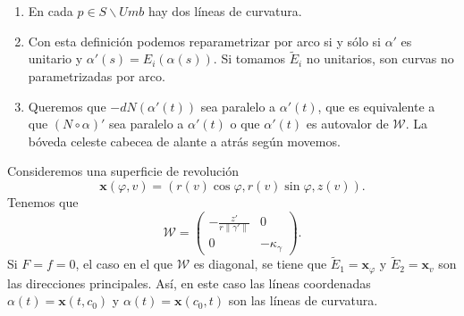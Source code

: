 \begin{observation}
\begin{enumerate}
	Así, tenemos que 
	\[\tilde{E}_{i}=\begin{pmatrix} -b \\ a - K_{i} \end{pmatrix}\quad \text{y} \quad E_{i}=\frac{\tilde{E}_{i}}{\|\tilde{E}_{i}\|} ,\]
	que son ambas $\displaystyle \mathcal{C}^{\infty } $. Además, $\displaystyle E_{1}\perp E_{2} $. Las líneas de flujos de $\displaystyle E_{1} $ y las de $\displaystyle E_{2} $ dan dos familias de curvas que son lineales de curvatura y que se cortan perpendicularmente. 
\item En cada $\displaystyle p \in S\backslash Umb $ hay dos líneas de curvatura. 
\item Con esta definición podemos reparametrizar por arco si y sólo si $\displaystyle \alpha'  $ es unitario y $\displaystyle \alpha'\left(s\right)=E_{i}\left(\alpha\left(s\right)\right) $. Si tomamos $\displaystyle \tilde{E}_{i} $ no unitarios, son curvas no parametrizadas por arco. 
\item Queremos que $\displaystyle -dN\left(\alpha'\left(t\right)\right) $ sea paralelo a $\displaystyle \alpha'\left(t\right) $, que es equivalente a que $\displaystyle \left(N\circ \alpha \right)' $ sea paralelo a $\displaystyle \alpha'\left(t\right) $ o que $\displaystyle \alpha'\left(t\right) $ es autovalor de $\displaystyle \mathcal{W} $. La bóveda celeste cabecea de alante a atrás según movemos. 
\end{enumerate}
\end{observation}
\begin{eg}
Consideremos una superficie de revolución
\[ \textbf{x} \left(\varphi, v\right)=\left(r\left(v\right)\cos \varphi, r\left(v\right)\sin \varphi, z\left(v\right)\right) .\]
Tenemos que 
\[\mathcal{W}=\begin{pmatrix} -\frac{z'}{r\|\gamma'\|} & 0 \\ 0 & -\kappa_{\gamma } \end{pmatrix} .\]
Si $\displaystyle F = f = 0 $, el caso en el que $\displaystyle \mathcal{W} $ es diagonal, se tiene que $\displaystyle \tilde{E}_{1}= \textbf{x} _{\varphi} $ y $\displaystyle \tilde{E}_{2}= \textbf{x} _{v} $ son las direcciones principales. Así, en este caso las líneas coordenadas $\displaystyle \alpha\left(t\right)= \textbf{x} \left(t, c_{0}\right) $ y $\displaystyle \alpha\left(t\right)= \textbf{x} \left(c_{0}, t\right) $ son las líneas de curvatura.
\end{eg}

